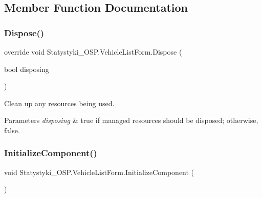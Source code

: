 \subsection{Member Function Documentation}
\mbox{\label{class_statystyki___o_s_p_1_1_vehicle_list_form_a91994c91f80d726d8e8e7adc873d35ba}} 
\subsubsection{\texorpdfstring{Dispose()}{Dispose()}}
{\footnotesize\ttfamily override void Statystyki\+\_\+\+O\+S\+P.\+Vehicle\+List\+Form.\+Dispose (\begin{DoxyParamCaption}\item[{bool}]{disposing }\end{DoxyParamCaption})\hspace{0.3cm}{\ttfamily [protected]}}



Clean up any resources being used. 


\begin{DoxyParams}{Parameters}
{\em disposing} & true if managed resources should be disposed; otherwise, false.\\
\hline
\end{DoxyParams}
\mbox{\label{class_statystyki___o_s_p_1_1_vehicle_list_form_a02a7ac2f0000efa353f033bba783e3b4}} 
\subsubsection{\texorpdfstring{InitializeComponent()}{InitializeComponent()}}
{\footnotesize\ttfamily void Statystyki\+\_\+\+O\+S\+P.\+Vehicle\+List\+Form.\+Initialize\+Component (\begin{DoxyParamCaption}{ }\end{DoxyParamCaption})\hspace{0.3cm}{\ttfamily [private]}}



